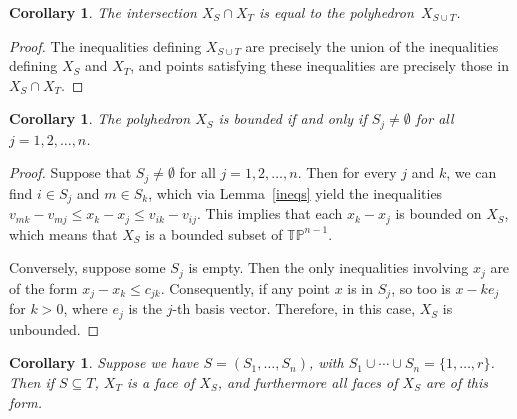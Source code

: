 \documentclass[11pt]{amsart}
\newtheorem{cor}[thm]{Corollary}
\newcommand{\TP}{\mathbb{TP}}
\begin{document}
\begin{cor}\label{intersectregion}
The intersection $X_S\cap X_T$ is equal to the polyhedron $\,X_{S\cup T}$.
\end{cor}
\begin{proof}
The inequalities defining $X_{S\cup T}$ are precisely the union of the inequalities defining $X_S$ 
and $X_T$, and points satisfying these inequalities are precisely those in $X_S\cap X_T$.
\end{proof}

\begin{cor}\label{boundedness}
The polyhedron $X_S$ is bounded if and only if
 $S_j \not= \emptyset $ for all $j = 1,2,\ldots,n$.
\end{cor}

\begin{proof}
Suppose that $S_j\neq \emptyset$ for all $j=1,2,\ldots,n$. Then for every $j$ and $k$, we can find 
$i\in S_j$ and $m\in S_k$, which via Lemma~\ref{ineqs} yield the inequalities 
$v_{mk}-v_{mj}\le x_k-x_j\le 
v_{ik}-v_{ij}$. This implies that each $x_k-x_j$ is bounded on $X_S$, which means that $X_S$ is 
a bounded subset of $\TP^{n-1}$.

Conversely, suppose some $S_j$ is empty. Then the only inequalities involving $x_j$ are of the 
form $x_j-x_k\le c_{jk}$. Consequently, if any point $x$ is in $S_j$, so too is $x-ke_j$ for 
$k>0$, where $e_j$ is the $j$-th basis vector. Therefore, in this case, $X_S$ is unbounded.
\end{proof}

\begin{cor}\label{regionfaces}
Suppose we have $S=(S_1,\ldots,S_n)$, with $S_1\cup\cdots\cup S_n = \{1,\ldots,r\}$. 
Then if $S\subseteq T$, $X_T$ is a
face of $X_S$, and furthermore all faces of $X_S$ are of this form. 
\end{cor}
\end{document}
